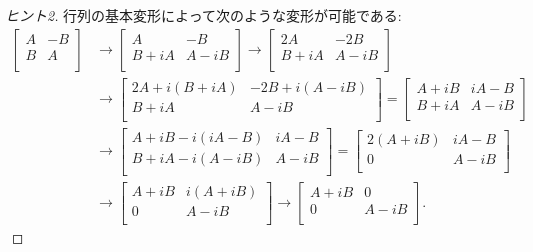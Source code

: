 \documentclass[12pt,twoside]{jarticle}
\begin{document}
\begin{proof}[ヒント2]
  行列の基本変形によって次のような変形が可能である:
  {\small
  \begin{align*}
    \begin{bmatrix}
      A & -B \\
      B &  A \\
    \end{bmatrix}
    & \to 
    \begin{bmatrix}
      A    & -B  \\
      B+iA & A-iB \\
    \end{bmatrix}
    \to
    \begin{bmatrix}
      2A   & -2B  \\
      B+iA & A-iB \\
    \end{bmatrix}
    \\
    & \to
    \begin{bmatrix}
      2A+i(B+iA) & -2B+i(A-iB) \\
      B+iA       & A-iB \\
    \end{bmatrix}
    =
    \begin{bmatrix}
      A+iB & iA-B \\
      B+iA & A-iB \\
    \end{bmatrix}
    \\
    & \to
    \begin{bmatrix}
      A+iB-i(iA-B) & iA-B \\
      B+iA-i(A-iB) & A-iB \\
    \end{bmatrix}
    =
    \begin{bmatrix}
      2(A+iB) & iA-B \\
        0     & A-iB \\
    \end{bmatrix}
    \\
    & \to
    \begin{bmatrix}
      A+iB & i(A+iB) \\
       0   & A-iB \\
    \end{bmatrix}
    \to
    \begin{bmatrix}
      A+iB &  0  \\
       0  & A-iB \\
    \end{bmatrix}.
  \end{align*}
}
\end{proof}
\end{document}
